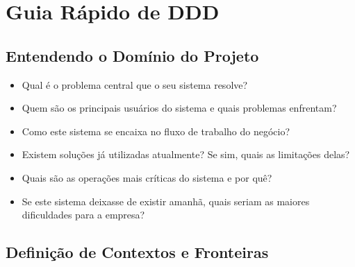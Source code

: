 \section{Guia Rápido de DDD}





\subsection{Entendendo o Domínio do Projeto}

\begin{itemize}
    \item Qual é o problema central que o seu sistema resolve?
    \item Quem são os principais usuários do sistema e quais problemas enfrentam?
    \item Como este sistema se encaixa no fluxo de trabalho do negócio?
    \item Existem soluções já utilizadas atualmente? Se sim, quais as limitações delas?
    \item Quais são as operações mais críticas do sistema e por quê?
    \item Se este sistema deixasse de existir amanhã, quais seriam as maiores dificuldades para a empresa?
\end{itemize}

\subsection{Definição de Contextos e Fronteiras}

